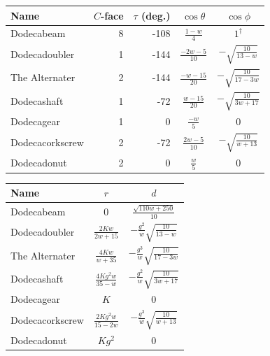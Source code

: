 \begin{center}
\small
\renewcommand{\arraystretch}{1.55}
\begin{tabular}{@{}lrrcc@{}}
\toprule
Name & $C$-face & $\tau$ (deg.) & $\cos\theta$ & $\cos\phi$\\
\midrule
Dodecabeam & 8 & -108 & $\displaystyle \frac{1 - w}{4}$ & $\displaystyle 1^{\dagger}$\\
Dodecadoubler & 1 & -144 & $\displaystyle \frac{- 2 w - 5}{10}$ & $\displaystyle - \sqrt{\frac{10}{13 - w}}$\\
The Alternater & 2 & -144 & $\displaystyle \frac{- w - 15}{20}$ & $\displaystyle - \sqrt{\frac{10}{17 - 3 w}}$\\
Dodecashaft & 1 & -72 & $\displaystyle \frac{w - 15}{20}$ & $\displaystyle - \sqrt{\frac{10}{3 w + 17}}$\\
Dodecagear & 1 & 0 & $\displaystyle \frac{- w}{5}$ & $\displaystyle 0$\\
Dodecacorkscrew & 2 & -72 & $\displaystyle \frac{2 w - 5}{10}$ & $\displaystyle - \sqrt{\frac{10}{w + 13}}$\\
Dodecadonut & 2 & 0 & $\displaystyle \frac{w}{5}$ & $\displaystyle 0$\\
\bottomrule
\end{tabular}
\end{center}
\begin{center}
\small
\renewcommand{\arraystretch}{1.6}
\begin{tabular}{@{}lcc@{}}
\toprule
Name & $r$ & $d$\\
\midrule
Dodecabeam & $\displaystyle 0$ & $\displaystyle \frac{\sqrt{110 w + 250}}{10}$\\
Dodecadoubler & $\displaystyle \frac{2 K w}{2 w + 15}$ & $\displaystyle -\frac{g^2}{w}\sqrt{\frac{10}{13 - w}}$\\
The Alternater & $\displaystyle \frac{4 K w}{w + 35}$ & $\displaystyle -\frac{g^3}{w}\sqrt{\frac{10}{17 - 3 w}}$\\
Dodecashaft & $\displaystyle \frac{4 K g^{2} w}{35 - w}$ & $\displaystyle -\frac{g^2}{w}\sqrt{\frac{10}{3 w + 17}}$\\
Dodecagear & $\displaystyle K$ & $\displaystyle 0$\\
Dodecacorkscrew & $\displaystyle \frac{2 K g^{2} w}{15 - 2 w}$ & $\displaystyle -\frac{g^3}{w}\sqrt{\frac{10}{w + 13}}$\\
Dodecadonut & $\displaystyle K g^{2}$ & $\displaystyle 0$\\
\bottomrule
\end{tabular}
\end{center}
